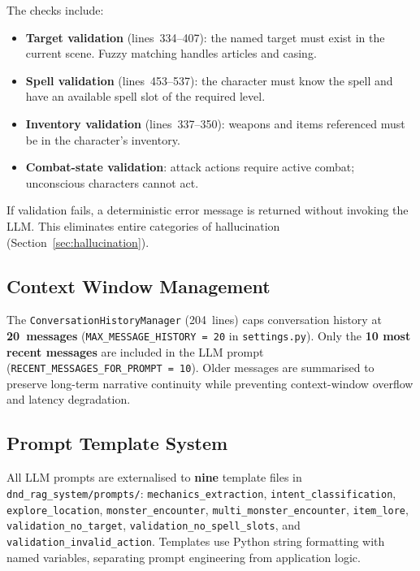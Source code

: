 \documentclass[12pt,a4paper]{article}
\begin{document}
The checks include:
\begin{itemize}[noitemsep]
    \item \textbf{Target validation} (lines~334--407): the named target must
          exist in the current scene. Fuzzy matching handles articles and
          casing.
    \item \textbf{Spell validation} (lines~453--537): the character must
          know the spell and have an available spell slot of the required
          level.
    \item \textbf{Inventory validation} (lines~337--350): weapons and items
          referenced must be in the character's inventory.
    \item \textbf{Combat-state validation}: attack actions require active
          combat; unconscious characters cannot act.
\end{itemize}

If validation fails, a deterministic error message is returned without
invoking the LLM. This eliminates entire categories of hallucination
(Section~\ref{sec:hallucination}).

\subsection{Context Window Management}

The \texttt{ConversationHistoryManager} (204~lines) caps conversation history
at \textbf{20~messages} (\texttt{MAX\_MESSAGE\_HISTORY\,=\,20} in
\texttt{settings.py}). Only the \textbf{10 most recent messages} are
included in the LLM prompt (\texttt{RECENT\_MESSAGES\_FOR\_PROMPT\,=\,10}).
Older messages are summarised to preserve long-term narrative continuity
while preventing context-window overflow and latency degradation.

\subsection{Prompt Template System}

All LLM prompts are externalised to \textbf{nine} template files in
\texttt{dnd\_rag\_system/prompts/}:
\texttt{mechanics\_extraction},
\texttt{intent\_classification},
\texttt{explore\_location},
\texttt{monster\_encounter},
\texttt{multi\_monster\_encounter},
\texttt{item\_lore},
\texttt{validation\_no\_target},
\texttt{validation\_no\_spell\_slots}, and
\texttt{validation\_invalid\_action}.
Templates use Python string formatting with named variables, separating
prompt engineering from application logic.
\end{document}
